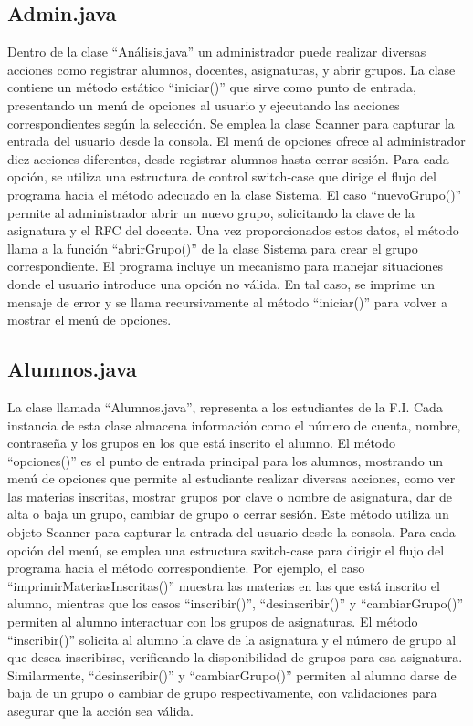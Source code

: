 \documentclass[a4paper,12pt]{article}
\begin{document}
\subsection{Admin.java}
Dentro de la clase “Análisis.java” un administrador puede realizar diversas acciones como 
registrar alumnos, docentes, asignaturas, y abrir grupos. La clase contiene un método 
estático “iniciar()” que sirve como punto de entrada, presentando un menú de opciones al 
usuario y ejecutando las acciones correspondientes según la selección. Se emplea la clase 
Scanner para capturar la entrada del usuario desde la consola.
El menú de opciones ofrece al administrador diez acciones diferentes, desde registrar 
alumnos hasta cerrar sesión. Para cada opción, se utiliza una estructura de control switch-case que dirige el flujo del programa hacia el método adecuado en la clase Sistema.
El caso “nuevoGrupo()” permite al administrador abrir un nuevo grupo, solicitando la clave de 
la asignatura y el RFC del docente. Una vez proporcionados estos datos, el método llama a la 
función “abrirGrupo()” de la clase Sistema para crear el grupo correspondiente.
El programa incluye un mecanismo para manejar situaciones donde el usuario introduce una 
opción no válida. En tal caso, se imprime un mensaje de error y se llama recursivamente al 
método “iniciar()” para volver a mostrar el menú de opciones.

\subsection{Alumnos.java}
La clase llamada “Alumnos.java”, representa a los estudiantes de la F.I. Cada instancia de 
esta clase almacena información como el número de cuenta, nombre, contraseña y los 
grupos en los que está inscrito el alumno.
El método “opciones()” es el punto de entrada principal para los alumnos, mostrando un 
menú de opciones que permite al estudiante realizar diversas acciones, como ver las 
materias inscritas, mostrar grupos por clave o nombre de asignatura, dar de alta o baja un 
grupo, cambiar de grupo o cerrar sesión. Este método utiliza un objeto Scanner para capturar 
la entrada del usuario desde la consola.
Para cada opción del menú, se emplea una estructura switch-case para dirigir el flujo del 
programa hacia el método correspondiente. Por ejemplo, el caso 
“imprimirMateriasInscritas()” muestra las materias en las que está inscrito el alumno, 
mientras que los casos “inscribir()”, “desinscribir()” y “cambiarGrupo()” permiten al alumno 
interactuar con los grupos de asignaturas.
El método “inscribir()” solicita al alumno la clave de la asignatura y el número de grupo al que 
desea inscribirse, verificando la disponibilidad de grupos para esa asignatura. Similarmente,
“desinscribir()” y “cambiarGrupo()” permiten al alumno darse de baja de un grupo o cambiar 
de grupo respectivamente, con validaciones para asegurar que la acción sea válida.
\end{document}
